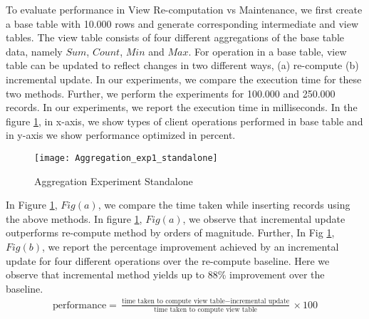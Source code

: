 \documentclass[11pt,a4paper,bibtotoc,idxtotoc,headsepline,footsepline,footexclude,BCOR12mm,DIV13]{scrbook}
\begin{document}
To evaluate performance in View Re-computation vs Maintenance, we first create a base table with 10.000 rows and generate corresponding intermediate and view tables. The view table consists of four different aggregations of the base table data, namely $Sum$, $Count$, $Min$ and $Max$. For operation in a base table, view table can be updated to reflect changes in two different ways, (a) re-compute (b) incremental update. In our experiments, we compare the execution time for these two methods. Further, we perform the experiments for 100.000 and 250.000 records. In our experiments, we report the execution time in milliseconds. In the figure \ref{sec:AggrExpStandalone}, in x-axis, we show types of client operations performed in base table and in y-axis we show performance optimized in percent. 

\begin{figure}
	\centering
	\texttt{[image: Aggregation\_exp1\_standalone]}
	\caption{Aggregation Experiment Standalone}
	\label{sec:AggrExpStandalone}
\end{figure} 
\newpage
In Figure \ref{sec:AggrExpStandalone}, $Fig(a)$, we compare the time taken while inserting records using the above methods. In figure \ref{sec:AggrExpStandalone}, $Fig(a)$, we observe that incremental update outperforms re-compute method by orders of magnitude. Further, In Fig \ref{sec:AggrExpStandalone}, $Fig(b)$, we report the percentage improvement achieved by an incremental update for four different operations over the re-compute baseline. Here we observe that incremental method yields up to 88\% improvement over the baseline.
\newline
\begin{align*}
\text{performance} = \frac{\text{time taken to compute view table} - \text{incremental update}}{\text{time taken to compute view table}} \times 100
\end{align*}
	 
\end{document}
